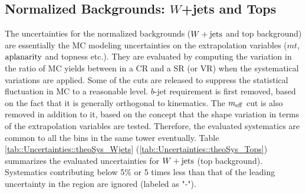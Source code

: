 \subsection{Normalized Backgrounds: $W$+jets and Tops} \label{sec:Uncertainties::normalizedBG}
The uncertainties for the normalized backgrounds ($W+\mathrm{jets}$ and top background) are essentially the MC modeling uncertainties on the extrapolation variables ($mt$, $\mathrm{aplanarity}$ and topness etc.).
They are evaluated by computing the variation in the ratio of MC yields between in a CR and a SR (or VR) when the systematical variations are applied.
Some of the cuts are released to suppress the statistical fluctuation in MC to a reasonable level.
$b$-jet requirement is first removed, based on the fact that it is generally orthogonal to kinematics. The $m_{\mathrm{eff}}$ cut is also removed in addition to it, based on the concept that the shape variation in terms of the extrapolation variables are tested. Therefore, the evaluated systematics are common to all the bins in the same tower eventually. Table \ref{tab::Uncertainties::theoSys_Wjets} (\ref{tab::Uncertainties::theoSys_Tops}) summarizes the evaluated uncertainties for $W+\mathrm{jets}$ (top background). Systematics contributing below 5$\%$ or 5 times less than that of the leading uncertainty in the region are ignored (labeled as "-").

